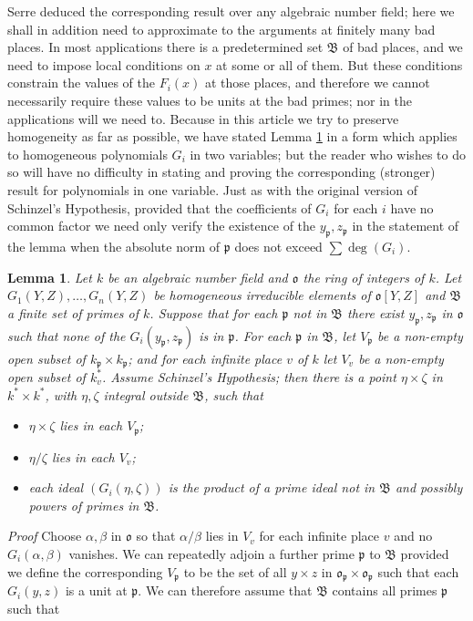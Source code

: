 \documentclass[12pt]{article}
\def\fB{{\mathfrak B}}
\def\fo{{\mathfrak o}}
\def\fp{{\mathfrak p}}
\def\ga{{\alpha}}
\def\gb{{\beta}}
\def\ble{\begin{lemma} \label}
\def\ele{\end{lemma}}
\newtheorem{lemma}{Lemma}
\begin{document}
Serre deduced the corresponding
result over any algebraic number field; here we shall in
addition need to approximate to the arguments at finitely
many bad places. In most applications
there is a predetermined set $\fB$ of bad places, and we need
to impose local conditions on $x$ at some or all of them.
But these conditions constrain the values of the $F_i(x)$
at those places, and therefore we
cannot necessarily require these values to be units at the
bad primes; nor in the applications will we need to.
Because in this article we try to preserve homogeneity as far as possible,
we have stated Lemma \ref{L1} in a form which applies to
homogeneous polynomials $G_i$ in two variables; but
the reader who wishes to do so will have no difficulty in stating and proving
the corresponding (stronger) result for polynomials in one variable.
Just as with the original version of
Schinzel's Hypothesis, provided that the coefficients
of $G_i$ for each $i$ have no
common factor we need only verify the existence of the
$y_\fp,z_\fp$ in the statement of the lemma when the absolute
norm of $\fp$ does not exceed $\sum\deg(G_i)$.
\ble{L1} Let $k$ be an algebraic number field and $\fo$ the ring of
integers of $k$. Let $G_1(Y,Z),\ldots,G_n(Y,Z)$ be homogeneous
irreducible elements of $\fo[Y,Z]$ and $\fB$ a finite set of primes of $k$.
Suppose that for each $\fp$ not in $\fB$ there exist $y_\fp,z_\fp$ in $\fo$
such that none of the $G_i(y_\fp,z_\fp)$ is in $\fp$.
For each $\fp$ in $\fB$, let $V_\fp$ be a non-empty open subset of $k_\fp
\times k_\fp$;
and for each infinite place $v$ of $k$ let $V_v$ be a
non-empty open subset of $k^*_v$. Assume Schinzel's
Hypothesis; then there is a point
$\eta\times\zeta$ in $k^*\times k^*$, with $\eta,\zeta$ integral outside
$\fB$, such that
\begin{itemize}
\item $\eta\times\zeta$ lies in each $V_\fp$;
\item $\eta/\zeta$ lies in each $V_v$;
\item each ideal $(G_i(\eta,\zeta))$ is the product of a prime ideal not in
$\fB$ and possibly powers of primes in $\fB$.
\end{itemize} \ele
\emph{Proof} Choose $\ga,\gb$ in $\fo$ so that $\ga/\gb$ lies in $V_v$ for
each infinite place $v$ and no $G_i(\ga,\gb)$ vanishes.
We can repeatedly adjoin a further prime $\fp$ to $\fB$ provided we define
the corresponding $V_\fp$ to be the set of all $y\times z$ in $\fo_\fp
\times\fo_\fp$
such that each $G_i(y,z)$ is a unit at $\fp$. We can therefore assume that
$\fB$ contains all primes $\fp$ such that
\end{document}
